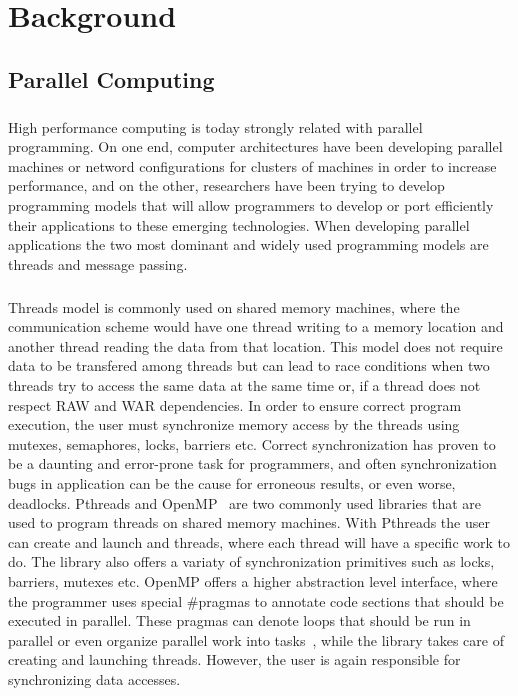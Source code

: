 \chapter{Background}
\section{Parallel Computing}
\paragraph{}
	High performance computing is today strongly related with parallel programming.  On one end, computer
architectures have been developing parallel machines or netword configurations for clusters of machines
in order to increase performance, and on the other, researchers have been trying to develop programming
models that will allow programmers to develop or port efficiently their applications to these emerging 
technologies.  When developing parallel applications the two most dominant and widely used programming 
models are threads and message passing.  

\paragraph{}
Threads model is commonly used on shared memory machines, where 
the communication scheme would have one thread writing to a memory location
and another thread reading the data from that location.  This model does not require data to be
transfered among threads but can lead to race conditions when two threads try to access the same
data at the same time or, if a thread does not respect RAW and WAR dependencies. 
In order to ensure correct program execution,
the user must synchronize memory access by the threads using mutexes, semaphores, locks, barriers etc.
Correct synchronization has proven to be a daunting and error-prone task for programmers, and often 
synchronization bugs in application can be the cause for  
erroneous results, or even worse, deadlocks.  Pthreads and OpenMP~\cite{Dagum:1998:OIA:615255.615542}
 are two commonly used libraries
that are used to program threads on shared memory machines.  With Pthreads the user can create and
launch and threads, where each thread will have a specific work to do.  The library also offers 
a variaty of synchronization primitives such as locks, barriers, mutexes etc.  OpenMP offers
a higher abstraction level interface, where the programmer uses special \#pragmas to annotate
code sections that should be executed in parallel.  These pragmas can denote loops that should 
be run in parallel or even organize parallel work into tasks~\cite{Ayguade:2009:DOT:1512157.1512430},
while the library takes care of creating and launching threads.  However, the user is again responsible
for synchronizing data accesses.

